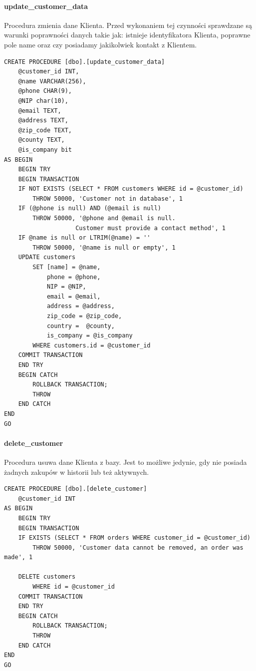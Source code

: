 \documentclass[12pt]{article}
\begin{document}
\paragraph{update\_customer\_data \\}
Procedura zmienia dane Klienta. Przed wykonaniem tej czynności sprawdzane są warunki poprawności danych takie jak: istnieje identyfikatora Klienta, poprawne pole name oraz czy posiadamy jakikolwiek kontakt z Klientem. \\
\begin{lstlisting}
CREATE PROCEDURE [dbo].[update_customer_data]
	@customer_id INT,
	@name VARCHAR(256),
	@phone CHAR(9),
	@NIP char(10),
	@email TEXT,
	@address TEXT,
	@zip_code TEXT,
	@county TEXT,
	@is_company bit
AS BEGIN
	BEGIN TRY
	BEGIN TRANSACTION
	IF NOT EXISTS (SELECT * FROM customers WHERE id = @customer_id)
		THROW 50000, 'Customer not in database', 1
	IF (@phone is null) AND (@email is null)
		THROW 50000, '@phone and @email is null.
        			Customer must provide a contact method', 1
	IF @name is null or LTRIM(@name) = ''
		THROW 50000, '@name is null or empty', 1
	UPDATE customers
		SET [name] = @name,
			phone = @phone,
			NIP = @NIP,
			email = @email,
			address = @address,
			zip_code = @zip_code,
			country =  @county,
			is_company = @is_company
		WHERE customers.id = @customer_id
	COMMIT TRANSACTION
	END TRY
	BEGIN CATCH
		ROLLBACK TRANSACTION;
		THROW
	END CATCH
END
GO

\end{lstlisting}
\newpage

\paragraph{delete\_customer \\}
Procedura usuwa dane Klienta z bazy. Jest to możliwe jedynie, gdy nie posiada żadnych zakupów w historii lub też aktywnych. \\
\begin{lstlisting}
CREATE PROCEDURE [dbo].[delete_customer]
	@customer_id INT
AS BEGIN
	BEGIN TRY
	BEGIN TRANSACTION
	IF EXISTS (SELECT * FROM orders WHERE customer_id = @customer_id)
		THROW 50000, 'Customer data cannot be removed, an order was made', 1

	DELETE customers
		WHERE id = @customer_id
	COMMIT TRANSACTION
	END TRY
	BEGIN CATCH
		ROLLBACK TRANSACTION;
		THROW
	END CATCH
END
GO

\end{lstlisting}
\newpage
\end{document}
